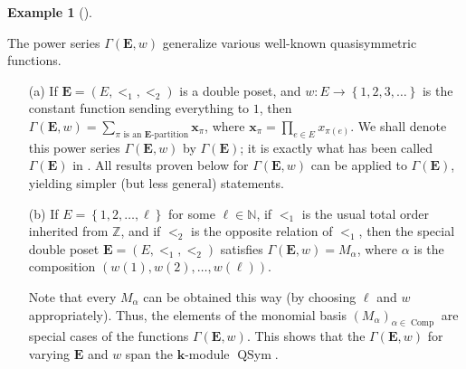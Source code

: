 \documentclass[numbers=enddot,12pt,final,onecolumn,notitlepage,abstracton]{scrartcl}%
\theoremstyle{definition}
\newtheorem{exam}[theo]{Example}
\newenvironment{example}[1][]
{\begin{exam}[#1]\begin{leftbar}}
{\end{leftbar}\end{exam}}
\let\sumnonlimits\sum
\let\prodnonlimits\prod
\renewcommand{\sum}{\sumnonlimits\limits}
\renewcommand{\prod}{\prodnonlimits\limits}
\newcommand{\kk}{{\mathbf{k}}}
\newcommand{\xx}{{\mathbf{x}}}
\newcommand{\Comp}{{\operatorname{Comp}}}
\newcommand{\QSym}{{\operatorname{QSym}}}
\newcommand{\EE}{{\mathbf{E}}}
\newcommand{\NN}{{\mathbb{N}}}
\newcommand{\ZZ}{{\mathbb{Z}}}
\begin{document}
\begin{example}
\label{exam.Gamma}
The power series $\Gamma\left(\EE , w\right)$ generalize various
well-known quasisymmetric functions.

\begin{enumerate}
\item[(a)] If $\EE = \left(E, <_1, <_2\right)$ is a double poset, and
$w : E \to \left\{1, 2, 3, \ldots\right\}$ is the constant
function sending everything to $1$, then
$\Gamma\left(\EE , w\right)
= \sum_{\pi\text{ is an }\EE\text{-partition}} \xx_{\pi}$,
where $\xx_{\pi} = \prod_{e \in E} x_{\pi\left(e\right)}$.
We shall denote this power series $\Gamma\left(\EE , w\right)$
by $\Gamma\left(\EE\right)$; it is exactly what has been called
$\Gamma\left(\EE\right)$ in \cite[\S 2.2]{Mal-Reu-DP}. All results
proven below for $\Gamma\left(\EE , w\right)$ can be applied to
$\Gamma\left(\EE\right)$, yielding simpler (but less general)
statements.

\item[(b)] If $E = \left\{1, 2, \ldots, \ell\right\}$ for some
$\ell \in \NN$, if $<_1$ is the usual total order inherited from
$\ZZ$, and if $<_2$ is the opposite relation of $<_1$, then the
special double poset $\EE = \left(E, <_1, <_2\right)$ satisfies
$\Gamma\left(\EE, w\right) = M_\alpha$, where $\alpha$ is the
composition $\left(w\left(1\right), w\left(2\right), \ldots,
w\left(\ell\right)\right)$.

Note that every $M_\alpha$ can be obtained
this way (by choosing $\ell$ and $w$ appropriately).
Thus, the elements of the monomial
basis $\left(M_\alpha\right)_{\alpha \in \Comp}$ are special
cases of the functions $\Gamma\left(\EE, w\right)$.
This shows that
the $\Gamma\left(\EE, w\right)$ for varying $\EE$ and $w$
span the $\kk$-module $\QSym$.


\end{enumerate}
\end{example}
\end{document}
